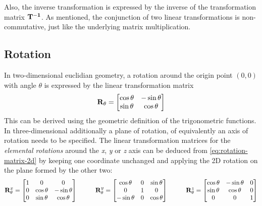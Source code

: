 Also, the inverse transformation is expressed by the inverse of the transformation matrix $\mathbf{T^{-1}}$. As mentioned, the conjunction of two linear transformations is non-commutative, just like the underlying matrix multiplication.

\subsection{Rotation}
In two-dimensional euclidian geometry, a rotation around the origin point $(0, 0)$ with angle $\theta$ is expressed by the linear transformation matrix
\begin{equation}
\mathbf{R}_{\theta} = \left[ \begin{matrix}
	\cos \theta & - \sin \theta \\
	\sin \theta & \cos \theta
\end{matrix} \right]
\label{eq:rotation-matrix-2d}
\end{equation}
This can be derived using the geometric definition of the trigonometric functions. In three-dimensional additionally a plane of rotation, of equivalently an axis of rotation needs to be specified. The linear transformation matrices for the \emph{elemental rotations} around the \emph{x}, \emph{y} or \emph{z} axis can be deduced from \ref{eq:rotation-matrix-2d} by keeping one coordinate unchanged and applying the 2D rotation on the plane formed by the other two:
\begin{equation}
\mathbf{R}_{\theta}^x = \left[ \begin{matrix}
	1 & 0 & 0 \\
	0 & \cos \theta & - \sin \theta \\
	0 & \sin \theta & \cos \theta
\end{matrix} \right]
\hspace{1cm}
\mathbf{R}_{\theta}^y = \left[ \begin{matrix}
	\cos \theta & 0 & \sin \theta \\
	0 & 1 & 0 \\
	- \sin \theta & 0 & \cos \theta
\end{matrix} \right]
\hspace{1cm}
\mathbf{R}_{\theta}^z = \left[ \begin{matrix}
	\cos \theta & - \sin \theta & 0 \\
	\sin \theta & \cos \theta & 0 \\
	0 & 0 & 1
\end{matrix} \right]
\end{equation}

